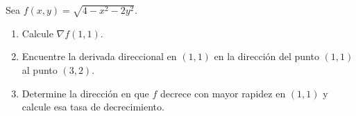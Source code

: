 Sea $f(x, y) = \sqrt{4 - x^2 - 2y^2}$.
\begin{enumerate}
    \item Calcule $\nabla f(1, 1)$.
    \item Encuentre la derivada direccional en $(1, 1)$ en la dirección del punto $(1, 1)$ al punto $(3, 2)$.
    \item Determine la dirección en que $f$ decrece con mayor rapidez en $(1, 1)$ y calcule esa tasa de decrecimiento.
\end{enumerate}
